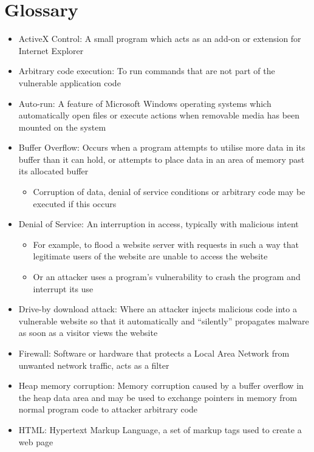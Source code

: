 \section{Glossary}

\begin{itemize}
\item ActiveX Control: A small program which acts as an add-on or extension for Internet Explorer \citep{Hoffman2013}
\item Arbitrary code execution: To run commands that are not part of the vulnerable application code
\item Auto-run: A feature of Microsoft Windows operating systems which automatically open files or execute actions when removable media has been mounted on the system
\item Buffer Overflow: Occurs when a program attempts to utilise more data in its buffer than it can hold, or attempts to place data in an area of memory  past its allocated buffer \citep{Ferragamo2014}
	\begin{itemize}
	\item Corruption of data, denial of service conditions or arbitrary code may be executed if this occurs	
	\end{itemize}
\item Denial of Service: An interruption in access, typically with malicious intent
	\begin{itemize}
	\item For example, to flood a website server with requests in such a way that legitimate users of the website are unable to access the website
	\item Or an attacker uses a program's vulnerability to crash the program and interrupt its use
	\end{itemize}
\item Drive-by download attack: Where an attacker injects malicious code into a vulnerable website so that it automatically and ``silently'' propagates malware as soon as a visitor views the website \citep{George2014}
\item Firewall: Software or hardware that protects a Local Area Network from unwanted network traffic, acts as a filter
\item Heap memory corruption: Memory corruption caused by a buffer overflow in the heap data area and may be used to exchange pointers in memory from normal program code to attacker arbitrary code \citep{Wikipedia2014, MITRE2014c}
\item HTML: Hypertext Markup Language, a set of markup tags used to create a web page

\end{itemize}
